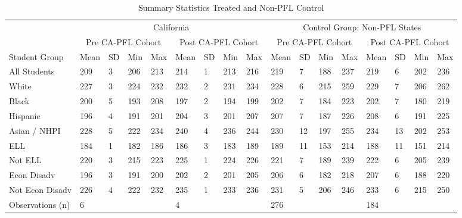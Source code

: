\begin{table}[!h]
\centering
\caption{Summary Statistics Treated and Non-PFL Control}
\centering
\begin{tabular}[t]{lllllllllllllllll}
\toprule
\multicolumn{1}{c}{ } & \multicolumn{8}{c}{California} & \multicolumn{8}{c}{Control Group: Non-PFL States} \\
\cmidrule(l{3pt}r{3pt}){2-9} \cmidrule(l{3pt}r{3pt}){10-17}
\multicolumn{1}{c}{ } & \multicolumn{4}{c}{Pre CA-PFL Cohort} & \multicolumn{4}{c}{Post CA-PFL Cohort} & \multicolumn{4}{c}{Pre CA-PFL Cohort} & \multicolumn{4}{c}{Post CA-PFL Cohort} \\
\cmidrule(l{3pt}r{3pt}){2-5} \cmidrule(l{3pt}r{3pt}){6-9} \cmidrule(l{3pt}r{3pt}){10-13} \cmidrule(l{3pt}r{3pt}){14-17}
Student Group & Mean & SD & Min & Max & Mean & SD & Min & Max & Mean & SD & Min & Max & Mean & SD & Min & Max\\
\midrule
All Students & 209 & 3 & 206 & 213 & 214 & 1 & 213 & 216 & 219 & 7 & 188 & 237 & 219 & 6 & 202 & 236\\
White & 227 & 3 & 224 & 232 & 232 & 2 & 231 & 234 & 228 & 6 & 215 & 259 & 229 & 7 & 206 & 262\\
Black & 200 & 5 & 193 & 208 & 197 & 2 & 194 & 199 & 202 & 7 & 184 & 223 & 202 & 7 & 180 & 219\\
Hispanic & 196 & 4 & 191 & 201 & 204 & 3 & 201 & 207 & 207 & 7 & 187 & 226 & 208 & 6 & 191 & 225\\
Asian / NHPI & 228 & 5 & 222 & 234 & 240 & 4 & 236 & 244 & 230 & 12 & 197 & 255 & 234 & 13 & 202 & 253\\
\addlinespace
ELL & 184 & 1 & 182 & 186 & 186 & 3 & 183 & 189 & 189 & 11 & 153 & 214 & 188 & 11 & 151 & 214\\
Not ELL & 220 & 3 & 215 & 223 & 225 & 1 & 224 & 226 & 221 & 7 & 189 & 239 & 222 & 6 & 205 & 239\\
Econ Disadv & 196 & 3 & 191 & 200 & 202 & 2 & 201 & 205 & 206 & 6 & 182 & 218 & 207 & 6 & 188 & 220\\
Not Econ Disadv & 226 & 4 & 222 & 232 & 235 & 1 & 233 & 236 & 231 & 5 & 206 & 246 & 233 & 6 & 215 & 250\\
Observations (n) & 6 &  &  &  & 4 &  &  &  & 276 &  &  &  & 184 &  &  & \\
\bottomrule
\end{tabular}
\end{table}
